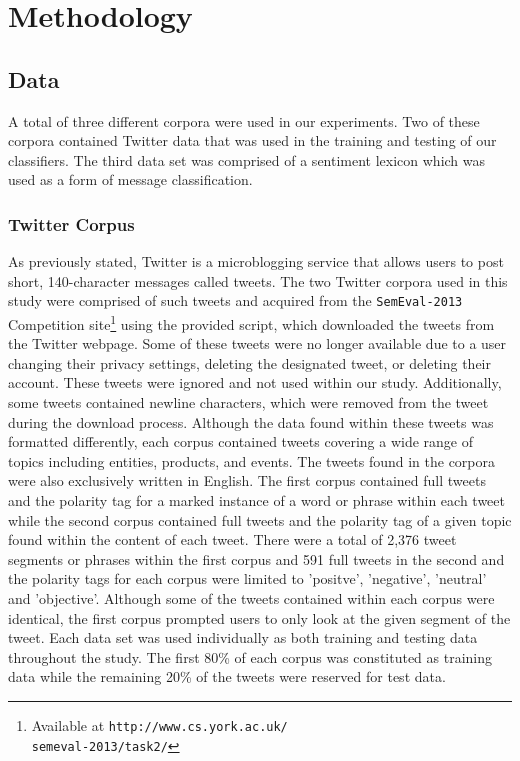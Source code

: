 \documentclass[11pt]{article}
\begin{document}
\section{Methodology}

\subsection{Data}
A total of three different corpora were used in our experiments. Two of these corpora contained Twitter data that was used in the training and testing of our classifiers. The third data set was comprised of a sentiment lexicon which was used as a form of message classification.

\subsubsection*{Twitter Corpus}
As previously stated, Twitter is a microblogging service that allows users to post short, 140-character messages called tweets.  The two Twitter corpora used in this study were comprised of such tweets and acquired from the {\tt SemEval-2013} Competition site\footnote{Available at {\tt http://www.cs.york.ac.uk/{\\}semeval-2013/task2/}} using the provided script, which downloaded the tweets from the Twitter webpage. Some of these tweets were no longer available due to a user changing their privacy settings, deleting the designated tweet, or deleting their account. These tweets were ignored and not used within our study. Additionally, some tweets contained newline characters, which were removed from the tweet during the download process. Although the data found within these tweets was formatted differently, each corpus contained tweets covering a wide range of topics including entities, products, and events. The tweets found in the corpora were also exclusively written in English. The first corpus contained full tweets and the polarity tag for a marked instance of a word or phrase within each tweet while the second corpus contained full tweets and the polarity tag of a given topic found within the content of each tweet. There were a total of 2,376 tweet segments or phrases within the first corpus and 591 full tweets in the second and the polarity tags for each corpus were limited to 'positve', 'negative', 'neutral' and 'objective'. Although some of the tweets contained within each corpus were identical, the first corpus prompted users to only look at the given segment of the tweet. Each data set was used individually as both training and testing data throughout the study. The first 80\% of each corpus was constituted as training data while the remaining 20\% of the tweets were reserved for test data. 
\end{document}
